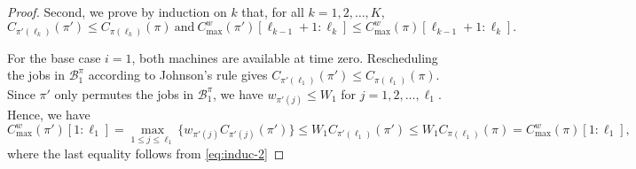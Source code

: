 ﻿\documentclass[12pt]{article} \textheight=24.5cm \textwidth=16.5cm \parskip = 0.165cm
\begin{document}
\begin{sloppypar}
\begin{proof}
        Second, we prove by induction on $k$ that, for all $k=1, 2, \ldots, K$,
            \begin{equation} \label{eq:induc-assump}
                C_{\pi'(\ell_k)} (\pi') \leq C_{\pi(\ell_k)}(\pi) ~ \mathrm{and}  ~ C_{\max}^w(\pi')[\ell_{k-1}+1:\ell_k] \leq C_{\max}^w(\pi)[\ell_{k-1}+1:\ell_k].
            \end{equation}

        For the base case $i=1$, both machines are available at time zero.
        Rescheduling the jobs in $\mathcal{B}_1^{\pi}$ according to Johnson's rule gives $C_{\pi'(\ell_1)}(\pi') \leq C_{\pi(\ell_1)}(\pi)$.
        Since $\pi'$ only permutes the jobs in $\mathcal{B}_1^{\pi}$, we have $w_{\pi'(j)} \leq W_1$ for $j=1, 2, \ldots, \ell_1$.
        Hence, we have
            \begin{equation*}
                C_{\max}^w(\pi')[1:\ell_1]= \max_{1 \leq j \leq \ell_1}\{w_{\pi'(j)}C_{\pi'(j)}(\pi')\} \leq W_1 C_{\pi'(\ell_1)}(\pi') \leq W_1 C_{\pi(\ell_1)}(\pi)=C_{\max}^w(\pi)[1:\ell_1],
            \end{equation*}
        where the last equality follows from \cref{eq:induc-2}


\end{proof}
\end{sloppypar}
\end{document}
